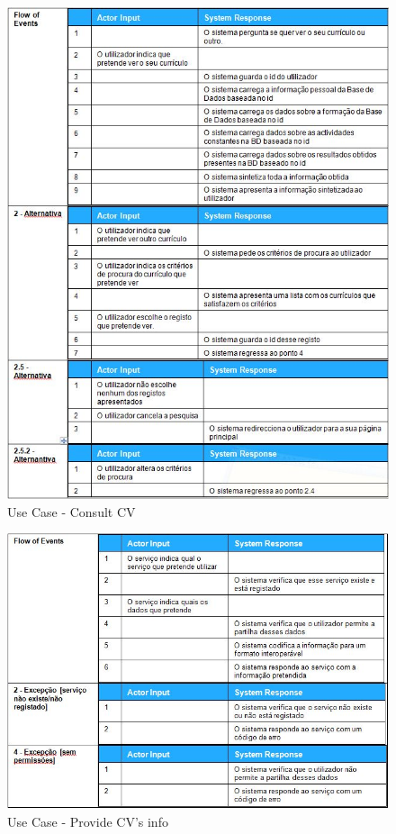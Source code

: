 \documentclass[a4paper,11pt,openright,openbib]{article}
\begin{document}
\begin{figure}[!ht]
\centering
\includegraphics[scale=1]{uc_consult_cv.jpg}
\caption{Use Case - Consult CV}
\label{fig:uc_consultcv}
\end{figure}
\begin{figure}[!ht]
\centering
\includegraphics[scale=.9]{uc_provide_cv_info.jpg}
\caption{Use Case - Provide CV\rq{}s info}
\label{fig:uc_providecvinfo}
\end{figure}
\end{document}
